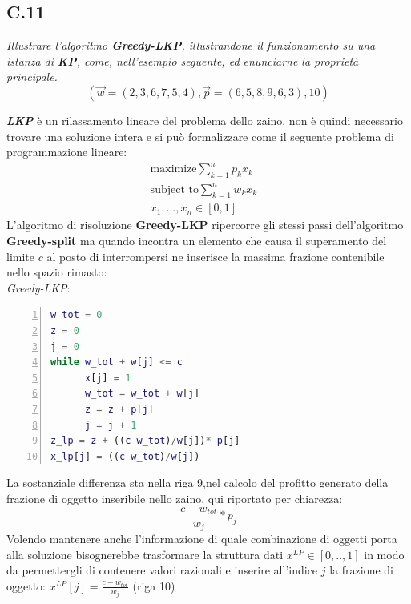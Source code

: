 \documentclass[a4paper]{article}
\newcommand{\imp}[1]{\textbf{\textit{#1}}}
\begin{document}
\subsection{C.11}
\emph{Illustrare l’algoritmo \textbf{Greedy-LKP}, illustrandone il funzionamento su una istanza di \textbf{KP}, come, nell'esempio seguente, ed enunciarne la proprietà principale.}
$$(\vec w = (2, 3, 6, 7, 5, 4), \vec p = (6, 5, 8, 9, 6, 3), 10)$$

\imp{LKP} è un rilassamento lineare del problema dello zaino, non è quindi necessario trovare una soluzione intera e si può formalizzare come il seguente problema di programmazione lineare:
\begin{align*}
	\text{maximize} \sum_{k=1}^n p_kx_k&\\
	\text{subject to} \sum_{k=1}^n w_kx_k&\\
	x_1,...,x_n \in [0,1]&
\end{align*}
L'algoritmo di risoluzione \textbf{Greedy-LKP} ripercorre gli stessi passi dell'algoritmo \textbf{Greedy-split} ma quando incontra un elemento che causa il superamento del limite $c$ al posto di interrompersi ne inserisce la massima frazione contenibile nello spazio rimasto:\\
\textit{Greedy-LKP}:
\begin{lstlisting}[numbers=left,firstnumber=1,language=Matlab, stepnumber=1, xleftmargin=15pt]
w_tot = 0
z = 0
j = 0
while w_tot + w[j] <= c
      x[j] = 1
      w_tot = w_tot + w[j]
      z = z + p[j]
      j = j + 1
z_lp = z + ((c-w_tot)/w[j])* p[j]  
x_lp[j] = ((c-w_tot)/w[j]) 
\end{lstlisting}
La sostanziale differenza sta nella riga 9,nel calcolo del profitto generato della frazione di oggetto inseribile nello zaino, qui riportato per chiarezza: $$\frac{c - w_{tot}}{w_j}*p_j$$
Volendo mantenere anche l'informazione di quale combinazione di oggetti porta alla soluzione bisognerebbe trasformare la struttura dati $x^{LP} \in [0,..,1]$ in modo da permettergli di contenere valori razionali e inserire all'indice $j$ la frazione di oggetto: $x^{LP}[j]=\frac{c - w_{tot}}{w_j}$ (riga 10)
\end{document}
